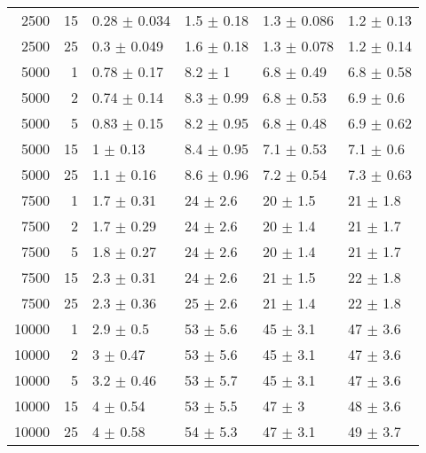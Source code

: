 \begin{tabular}{rrllll}
  2500 & 15 & 0.28 $\pm$ 0.034 & 1.5 $\pm$ 0.18 & 1.3 $\pm$ 0.086 & 1.2 $\pm$ 0.13 \\ 
  2500 & 25 & 0.3 $\pm$ 0.049 & 1.6 $\pm$ 0.18 & 1.3 $\pm$ 0.078 & 1.2 $\pm$ 0.14 \\ 
  5000 &  1 & 0.78 $\pm$ 0.17 & 8.2 $\pm$ 1 & 6.8 $\pm$ 0.49 & 6.8 $\pm$ 0.58 \\ 
  5000 &  2 & 0.74 $\pm$ 0.14 & 8.3 $\pm$ 0.99 & 6.8 $\pm$ 0.53 & 6.9 $\pm$ 0.6 \\ 
  5000 &  5 & 0.83 $\pm$ 0.15 & 8.2 $\pm$ 0.95 & 6.8 $\pm$ 0.48 & 6.9 $\pm$ 0.62 \\ 
  5000 & 15 & 1 $\pm$ 0.13 & 8.4 $\pm$ 0.95 & 7.1 $\pm$ 0.53 & 7.1 $\pm$ 0.6 \\ 
  5000 & 25 & 1.1 $\pm$ 0.16 & 8.6 $\pm$ 0.96 & 7.2 $\pm$ 0.54 & 7.3 $\pm$ 0.63 \\ 
  7500 &  1 & 1.7 $\pm$ 0.31 & 24 $\pm$ 2.6 & 20 $\pm$ 1.5 & 21 $\pm$ 1.8 \\ 
  7500 &  2 & 1.7 $\pm$ 0.29 & 24 $\pm$ 2.6 & 20 $\pm$ 1.4 & 21 $\pm$ 1.7 \\ 
  7500 &  5 & 1.8 $\pm$ 0.27 & 24 $\pm$ 2.6 & 20 $\pm$ 1.4 & 21 $\pm$ 1.7 \\ 
  7500 & 15 & 2.3 $\pm$ 0.31 & 24 $\pm$ 2.6 & 21 $\pm$ 1.5 & 22 $\pm$ 1.8 \\ 
  7500 & 25 & 2.3 $\pm$ 0.36 & 25 $\pm$ 2.6 & 21 $\pm$ 1.4 & 22 $\pm$ 1.8 \\ 
  10000 &  1 & 2.9 $\pm$ 0.5 & 53 $\pm$ 5.6 & 45 $\pm$ 3.1 & 47 $\pm$ 3.6 \\ 
  10000 &  2 & 3 $\pm$ 0.47 & 53 $\pm$ 5.6 & 45 $\pm$ 3.1 & 47 $\pm$ 3.6 \\ 
  10000 &  5 & 3.2 $\pm$ 0.46 & 53 $\pm$ 5.7 & 45 $\pm$ 3.1 & 47 $\pm$ 3.6 \\ 
  10000 & 15 & 4 $\pm$ 0.54 & 53 $\pm$ 5.5 & 47 $\pm$ 3 & 48 $\pm$ 3.6 \\ 
  10000 & 25 & 4 $\pm$ 0.58 & 54 $\pm$ 5.3 & 47 $\pm$ 3.1 & 49 $\pm$ 3.7 \\ 
   \bottomrule
\end{tabular}
